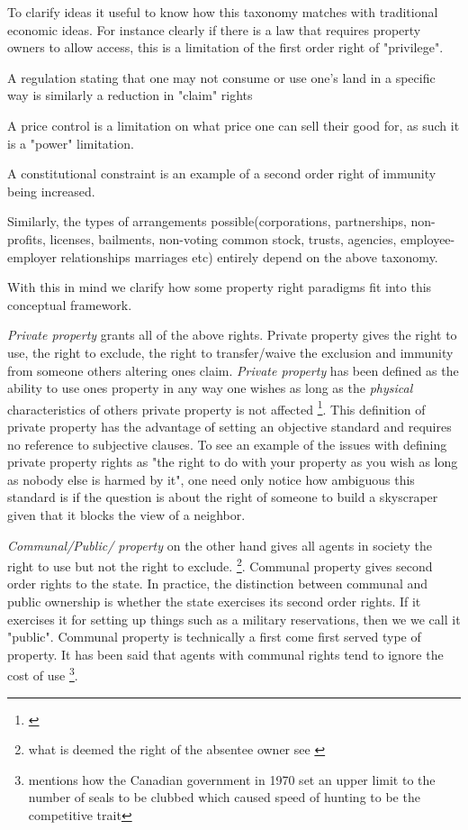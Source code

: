 \documentclass[12pt]{article}
\numberwithin{equation}{section}
\begin{document}
To clarify ideas it useful to know how this taxonomy matches with traditional economic ideas. For instance clearly if there is a law that requires property owners to allow access, this is a limitation of the first order right of "privilege". 

A regulation stating that one may not consume or use one's land in a specific way is similarly a reduction in "claim" rights

A price control is a limitation on what price one can sell their good for, as such it is a "power" limitation. 

A constitutional constraint is an example of a second order right of immunity being increased. 


Similarly, the types of arrangements possible(corporations, partnerships, non-profits, licenses, bailments, non-voting common stock, trusts, agencies, employee-employer relationships marriages etc) entirely depend on the above taxonomy. 

With this in mind we clarify how some property right paradigms fit into this conceptual framework. 

\textit{Private property} grants all of the above rights. Private property gives the right to use, the right to exclude, the right to transfer/waive the exclusion and immunity from someone others altering ones claim. \textit{Private property} has been defined as the ability to use ones property in any way one wishes as long as the \textit{physical} characteristics of others private property is not affected \footnote{\cite{Alchian1965}}. This definition of private property has the advantage of setting an objective standard and requires no reference to subjective clauses. To see an example of the issues with defining private property rights as "the right to do with your property as you wish as long as nobody else is harmed by it", one need only notice how ambiguous this standard is if the question is about the right of someone to build a skyscraper given that it blocks the view of a neighbor. 

\textit{Communal/Public/ property} on the other hand gives all agents in society the right to use but not the right to exclude. \footnote{what is deemed the right of the absentee owner see \cite{Alchian1973}}. Communal property gives second order rights to the state. In practice, the distinction between communal and public ownership is whether the state exercises its second order rights. If it exercises it for setting up things such as a military reservations, then we we call it "public". Communal property is technically a first come first served type of property. It has been said that agents with communal rights tend to ignore the cost of use \footnote{\cite{Alchian1973} mentions how the Canadian government in 1970 set an upper limit to the number of seals to be clubbed which caused speed of hunting to be the competitive trait}. 
\end{document}
